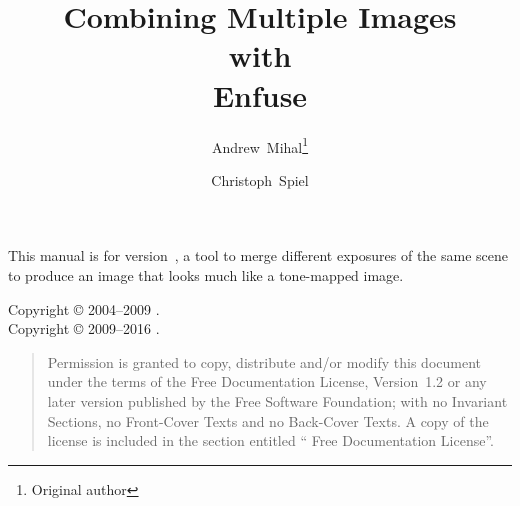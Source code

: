 

\begin{titlepage}
  \renewcommand{\thefootnote}{\fnsymbol{footnote}}

  \author{Andrew~Mihal\footnote{Original author} \and Christoph~Spiel}

  \title{Combining Multiple Images\\ with\\ Enfuse }

  \date{}

  \maketitle
\end{titlepage}


\vspace*{\fill}
\ifhevea
  \relax
\else
  \begin{center}\end{center}
\fi

\label{sec:abstract}\noindent
This manual is for \App{} version~, a tool to merge different exposures of the
same scene to produce an image that looks much like a tone-mapped image.

\vspace*{\fill}

\begin{flushleft}
  Copyright \copyright{} 2004--2009 . \\
  Copyright \copyright{} 2009--2016 .
\end{flushleft}

\begin{quotation}
  \noindent Permission is granted to copy, distribute and/or modify this document under the
  terms of the  Free Documentation License, Version~1.2 or any later version
  published by the Free Software Foundation; with no Invariant Sections, no Front-Cover Texts
  and no Back-Cover Texts.  A copy of the license is included in the section entitled
  `` Free Documentation License''.
\end{quotation}

\cleardoublepage{}


